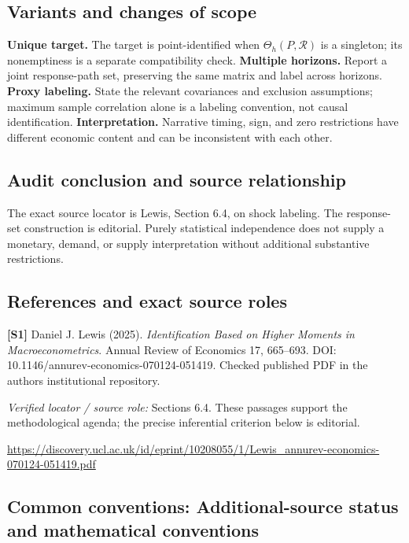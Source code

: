 \documentclass[11pt,a4paper]{article}
\begin{document}
\subsection*{Variants and changes of scope}

\textbf{Unique target.} The target is point-identified when $\Theta_h(P,\mathcal R)$ is a singleton; its nonemptiness is a separate compatibility check. \textbf{Multiple horizons.} Report a joint response-path set, preserving the same matrix and label across horizons. \textbf{Proxy labeling.} State the relevant covariances and exclusion assumptions; maximum sample correlation alone is a labeling convention, not causal identification. \textbf{Interpretation.} Narrative timing, sign, and zero restrictions have different economic content and can be inconsistent with each other.

\subsection*{Audit conclusion and source relationship}

The exact source locator is Lewis, Section 6.4, on shock labeling. The response-set construction is editorial. Purely statistical independence does not supply a monetary, demand, or supply interpretation without additional substantive restrictions.

\subsection*{References and exact source roles}

{\footnotesize\raggedright
\par\noindent\textbf{[S1]} Daniel J. Lewis (2025). \emph{Identification Based on Higher Moments in Macroeconometrics}. Annual Review of Economics 17, 665--693. DOI: 10.1146/annurev-economics-070124-051419. Checked published PDF in the author\textquotesingle s institutional repository.\par \textit{Verified locator / source role:} Sections 6.4. These passages support the methodological agenda; the precise inferential criterion below is editorial.\par \url{https://discovery.ucl.ac.uk/id/eprint/10208055/1/Lewis_annurev-economics-070124-051419.pdf}\par\smallskip
}

\subsection*{Common conventions: Additional-source status and mathematical conventions}
\end{document}
